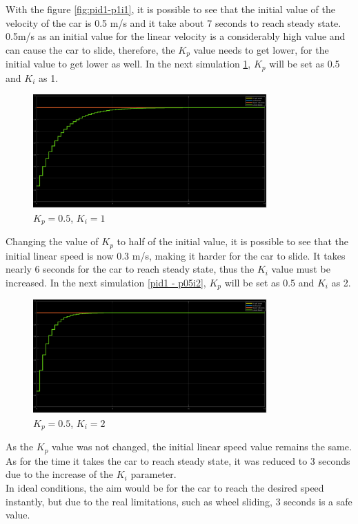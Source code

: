 With the figure \ref{fig:pid1-p1i1}, it is possible to see that the initial value of the velocity of the car is 0.5 m/s and it take about 7 seconds to reach steady state. 0.5m/s as an initial value for the linear velocity is a considerably high value and can cause the car to slide, therefore, the $K_p$ value needs to get lower, for the initial value to get lower as well.
In the next simulation \ref{fig:pid1-p05i1}, $K_p$ will be set as 0.5 and $K_i$ as 1.
\begin{figure}[!h]
\centering
\includegraphics[width=0.8\textwidth]{./img/pid051.png}
\caption {\label{fig:pid1-p05i1}$K_p=0.5$, $K_i=1$}
\end{figure}
Changing the value of $K_p$ to half of the initial value, it is possible to see that the initial linear speed is now 0.3 m/s, making it harder for the car to slide. It takes nearly 6 seconds for the car to reach steady state, thus the $K_i$ value must be increased.
In the next simulation \ref{pid1 - p05i2}, $K_p$ will be set as 0.5 and $K_i$ as 2.
\begin{figure}[!h]
\centering
\includegraphics[width=0.8\textwidth]{./img/pid052.png}
\caption {\label{fig:pid1 - p05i2}$K_p=0.5$, $K_i=2$}
\end{figure}
As the $K_p$ value was not changed, the initial linear speed value remains the same. As for the time it takes the car to reach steady state, it was reduced to 3 seconds due to the increase of the $K_i$ parameter.\\
In ideal conditions, the aim would be for the car to reach the desired speed
instantly, but due to the real limitations, such as wheel sliding, 3 seconds is
a safe value.
%
